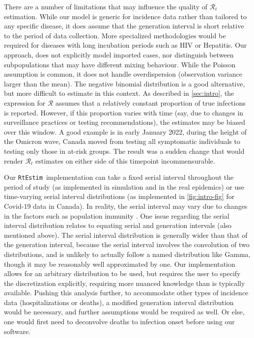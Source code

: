 \documentclass[10pt,letterpaper]{article}
\def\RtEstim{\texttt{RtEstim}}
\def\calR{\mathcal{R}}
\begin{document}
There are a number of limitations that may influence the quality of
$\calR_t$ estimation. While our model is generic for incidence data 
rather than tailored to any specific disease, it does assume that the 
generation interval is short relative to the period of data collection. 
More specialized methodologies would be required for diseases with long 
incubation periods such as HIV or Hepatitis. 
Our approach, does not explicitly model imported cases, nor distinguish between
subpopulations that may have different mixing behaviour. 
While the Poisson assumption is common, it does not handle overdispersion
(observation variance larger than the mean). The negative binomial distribution
is a good alternative, but more difficult to estimate in this context.
As described in \autoref{sec:intro}, the expression for $\calR$ 
assumes that a relatively constant proportion of true infections is reported. 
However, if this proportion varies with time (say, due to changes in surveillance
practices or testing recommendations), the estimates may be biased over this
window. A good example is in early January 2022, during the height of the
Omicron wave, Canada moved from testing all symptomatic individuals to
testing only those in at-risk groups. The result was a sudden change that would
render $\calR_t$ estimates on either side of this timepoint incommensurable.


Our \RtEstim\ implementation can take a fixed serial interval throughout the
period of study (as implemented in simulation and in the real epidemics) or 
use time-varying serial interval distributions (as implemented 
in \autoref{fig:intro-fig} for Covid-19 data in Canada). In reality, the serial
interval may vary due to changes in the factors such as population immunity 
\cite{nash2023estimating}. One issue regarding the serial interval distribution 
relates to equating serial and generation intervals (also mentioned above). 
The serial interval distribution is generally wider than that 
of the generation interval, because the serial interval involves the convolution
of two distributions, and is unlikely to actually follow a named distribution
like Gamma, though it may be reasonably well approximated by one. Our
implementation allows for an arbitrary distribution to be used, but requires the
user to specify the discretization explicitly, requiring more nuanced knowledge
than is typically available. Pushing this analysis further, to accommodate other
types of incidence data (hospitalizations or deaths), a modified generation
interval distribution would be necessary, and further assumptions would be
required as well. Or else, one would first need to deconvolve deaths to
infection onset before using our software.
\end{document}
